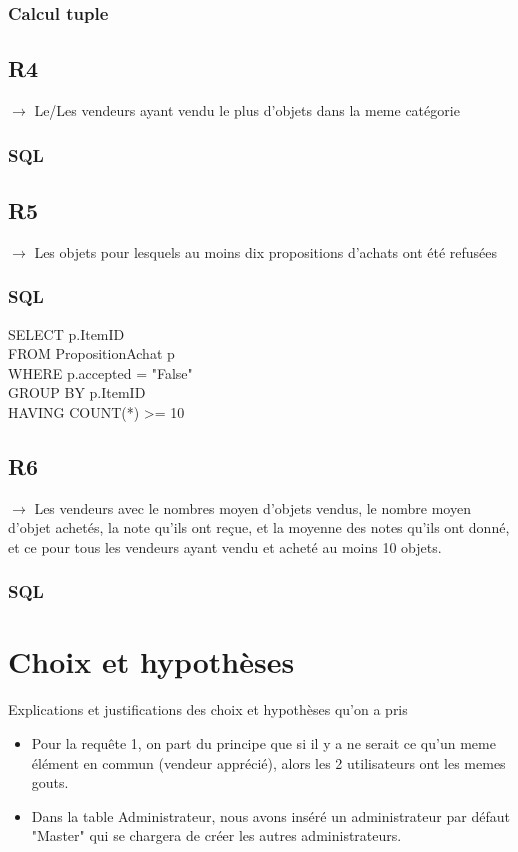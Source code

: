\documentclass[a4paper,11pt]{article}
\begin{document}
\subsubsection{Calcul tuple}

\subsection{R4}

$\rightarrow$ Le/Les vendeurs ayant vendu le plus d'objets dans la meme catégorie

\subsubsection{SQL}


\subsection{R5}

$\rightarrow$ Les objets pour lesquels au moins dix propositions d'achats ont été refusées

\subsubsection{SQL}

SELECT p.ItemID\\
FROM PropositionAchat p\\
WHERE p.accepted = "False"\\
GROUP BY p.ItemID\\
HAVING COUNT(*) >= 10


\subsection{R6}

$\rightarrow$ Les vendeurs avec le nombres moyen d'objets vendus, le nombre moyen d'objet achetés, la note qu'ils ont reçue, et la moyenne des notes qu'ils ont donné, et ce pour tous les vendeurs ayant vendu et acheté au moins 10 objets.

\subsubsection{SQL}


\section{Choix et hypothèses}

Explications et justifications des choix et hypothèses qu'on a pris

\begin{itemize}
	\item Pour la requête 1, on part du principe que si il y a ne serait ce qu'un meme élément en commun (vendeur apprécié), alors les 2 utilisateurs ont les memes gouts.
    \item Dans la table Administrateur, nous avons inséré un administrateur par défaut "Master" qui se chargera de créer les autres administrateurs.
   
    
\end{itemize}
\end{document}
